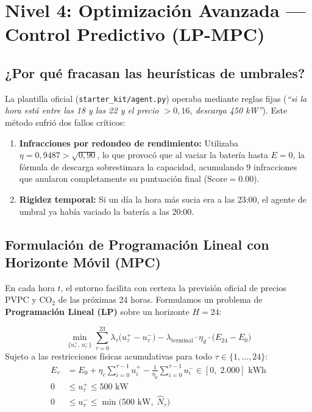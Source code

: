 \documentclass[a4paper,11pt]{article}
\begin{document}
\newpage

\section{Nivel 4: Optimización Avanzada — Control Predictivo (LP-MPC)}

\subsection{¿Por qué fracasan las heurísticas de umbrales?}
La plantilla oficial (\texttt{starter\_kit/agent.py}) operaba mediante reglas fijas (\emph{``si la hora está entre las 18 y las 22 y el precio $> 0{,}16$, descarga 450 kW''}). 
Este método sufrió dos fallos críticos:
\begin{enumerate}
    \item \textbf{Infracciones por redondeo de rendimiento:} Utilizaba $\eta = 0{,}9487 > \sqrt{0{,}90}$, lo que provocó que al vaciar la batería hasta $E=0$, la fórmula de descarga sobrestimara la capacidad, acumulando 9 infracciones que anularon completamente su puntuación final ($\text{Score} = 0.00$).
    \item \textbf{Rigidez temporal:} Si un día la hora más sucia era a las 23:00, el agente de umbral ya había vaciado la batería a las 20:00.
\end{enumerate}

\subsection{Formulación de Programación Lineal con Horizonte Móvil (MPC)}
En cada hora $t$, el entorno facilita con certeza la previsión oficial de precios PVPC y CO$_2$ de las próximas 24 horas. Formulamos un problema de \textbf{Programación Lineal (LP)} sobre un horizonte $H = 24$:

\begin{tcolorbox}[colback=azulupc!5!white,colframe=azulupc,title=PROBLEMA DE PROGRAMACIÓN LINEAL (LP-MPC)]
\begin{equation}
\min_{\{u_\tau^+,\, u_\tau^-\}} \sum_{\tau=0}^{23} \lambda_\tau \big(u_\tau^+ - u_\tau^-\big) - \lambda_{\text{terminal}} \cdot \eta_d \cdot \big(E_{24} - E_0\big)
\end{equation}
Sujeto a las restricciones físicas acumulativas para todo $\tau \in \{1, \dots, 24\}$:
\begin{align}
E_\tau &= E_0 + \eta_c \sum_{i=0}^{\tau-1} u_i^+ - \frac{1}{\eta_d} \sum_{i=0}^{\tau-1} u_i^- \in [0,\; 2.000]\text{ kWh} \\
0 &\le u_\tau^+ \le 500\text{ kW} \\
0 &\le u_\tau^- \le \min\big(500\text{ kW},\; \hat{N}_\tau\big)
\end{align}
\end{tcolorbox}
\end{document}
